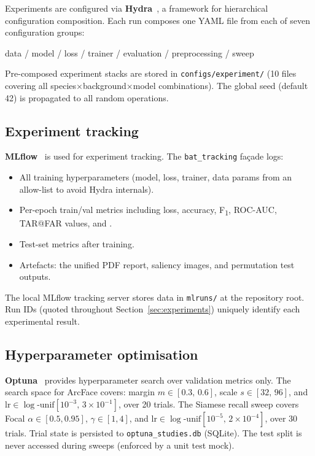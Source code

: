 Experiments are configured via \textbf{Hydra}~\cite{yadan2019hydra}, a framework for
hierarchical configuration composition.  Each run composes one YAML file from each of
seven configuration groups:

\begin{center}
\ttfamily\small
\textup{data} / \textup{model} / \textup{loss} / \textup{trainer} /
\textup{evaluation} / \textup{preprocessing} / \textup{sweep}
\end{center}

Pre-composed experiment stacks are stored in \texttt{configs/experiment/} (10 files
covering all species$\times$background$\times$model combinations).  The global seed
(default 42) is propagated to all random operations.

\subsection{Experiment tracking}

\textbf{MLflow}~\cite{mlflow2018} is used for experiment tracking.  The
\texttt{bat\_tracking} façade logs:
\begin{itemize}[itemsep=2pt]
  \item All training hyperparameters (model, loss, trainer, data params from an
        allow-list to avoid Hydra internals).
  \item Per-epoch train/val metrics including loss, accuracy, F\textsubscript{1},
        ROC-AUC, TAR@FAR values, and \recall.
  \item Test-set metrics after training.
  \item Artefacts: the unified PDF report, saliency images, and permutation test outputs.
\end{itemize}
The local MLflow tracking server stores data in \texttt{mlruns/} at the repository root.
Run IDs (quoted throughout Section~\ref{sec:experiments}) uniquely identify each
experimental result.

\subsection{Hyperparameter optimisation}

\textbf{Optuna}~\cite{akiba2019optuna} provides hyperparameter search over validation
metrics only.  The search space for ArcFace covers:
margin $m \in [0.3,\,0.6]$, scale $s \in [32,\,96]$, and
$\mathrm{lr} \in \log\text{-unif}[10^{-3},\,3{\times}10^{-1}]$, over 20 trials.
The Siamese recall sweep covers Focal $\alpha\in[0.5,0.95]$, $\gamma\in[1,4]$,
and $\mathrm{lr}\in\log\text{-unif}[10^{-5},\,2{\times}10^{-4}]$, over 30 trials.
Trial state is persisted to \texttt{optuna\_studies.db} (SQLite).
The test split is never accessed during sweeps (enforced by a unit test mock).

